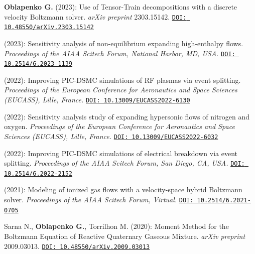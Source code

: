 \begin{enumerate}
  \preprintitem \textbf{Oblapenko G.} (2023): Use of Tensor-Train decompositions with a discrete velocity Boltzmann solver. \textit{arXiv preprint} 2303.15142.
  \newline
    \href{https://doi.org/10.48550/arXiv.2303.15142}{\texttt{DOI: 10.48550/arXiv.2303.15142}}
  
   (2023): Sensitivity analysis of non-equilibrium expanding high-enthalpy flows.\textit{ Proceedings of the AIAA Scitech Forum, National Harbor, MD, USA.}
  \newline
    \href{https://doi.org/10.2514/6.2023-1139}{\texttt{DOI: 10.2514/6.2023-1139}}

   (2022): Improving PIC-DSMC simulations of RF plasmas via event splitting.\textit{ Proceedings of the European Conference for Aeronautics and Space Sciences (EUCASS), Lille, France.}
  \newline
    \href{https://doi.org/10.13009/EUCASS2022-6130}{\texttt{DOI: 10.13009/EUCASS2022-6130}}


   (2022): Sensitivity analysis study of expanding hypersonic flows of nitrogen and oxygen. \textit{Proceedings of the European Conference for Aeronautics and Space Sciences (EUCASS), Lille, France.}
  \newline
    \href{https://doi.org/10.13009/EUCASS2022-6032}{\texttt{DOI: 10.13009/EUCASS2022-6032}}
  

   (2022): Improving PIC-DSMC simulations of electrical breakdown via event splitting. \textit{Proceedings of the AIAA Scitech Forum, San Diego, CA, USA.}
  \newline
    \href{https://doi.org/10.2514/6.2022-2152}{\texttt{DOI: 10.2514/6.2022-2152}}
  
   (2021): Modeling of ionized gas flows with a velocity-space hybrid Boltzmann solver. \textit{Proceedings of the AIAA Scitech Forum, Virtual.}
  \newline
    \href{https://doi.org/10.2514/6.2021-0705}{\texttt{DOI: 10.2514/6.2021-0705}}

    \preprintitem Sarna N., \textbf{Oblapenko G.}, Torrilhon M. (2020): Moment Method for the Boltzmann Equation of Reactive Quaternary Gaseous Mixture. \textit{arXiv preprint} 2009.03013.
  \newline
    \href{https://doi.org/10.48550/arXiv.2009.03013}{\texttt{DOI: 10.48550/arXiv.2009.03013}}
  

\end{enumerate}
